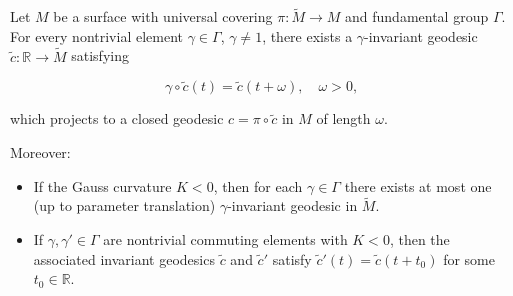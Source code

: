 Let $M$ be a surface with universal covering $\pi: \tilde{M} \to M$ and fundamental group $\Gamma$. For every nontrivial element $\gamma \in \Gamma$, $\gamma \neq 1$, there exists a $\gamma$-invariant geodesic $\tilde{c}: \mathbb{R} \to \tilde{M}$ satisfying

$$\gamma \circ \tilde{c}(t) = \tilde{c}(t + \omega), \quad \omega > 0,$$

which projects to a closed geodesic $c = \pi \circ \tilde{c}$ in $M$ of length $\omega$.

Moreover:
\begin{itemize}
\item[(iii)] If the Gauss curvature $K < 0$, then for each $\gamma \in \Gamma$ there exists at most one (up to parameter translation) $\gamma$-invariant geodesic in $\tilde{M}$.
\item[(iv)] If $\gamma, \gamma' \in \Gamma$ are nontrivial commuting elements with $K < 0$, then the associated invariant geodesics $\tilde{c}$ and $\tilde{c}'$ satisfy $\tilde{c}'(t) = \tilde{c}(t + t_0)$ for some $t_0 \in \mathbb{R}$.
\end{itemize}
